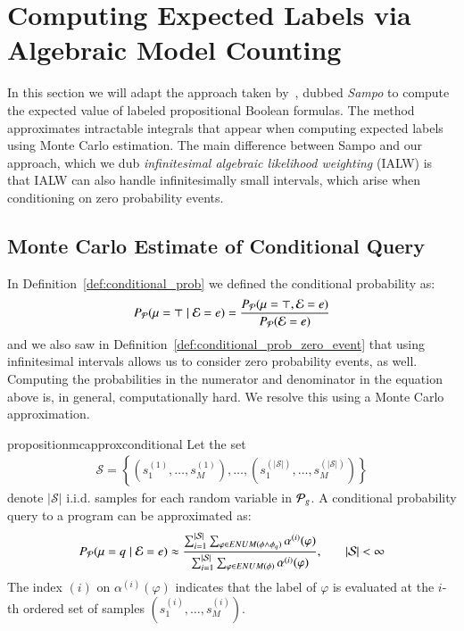 \section{Computing Expected Labels via Algebraic Model Counting}
\label{sec:alw}


In this section we will adapt the approach taken by~\citet{zuidbergdosmartires2019exact}, dubbed {\em Sampo} to compute the expected value of labeled propositional Boolean formulas.
The method approximates intractable integrals that appear when computing expected labels using Monte Carlo estimation. The main difference between Sampo and our approach, which we dub {\em infinitesimal algebraic likelihood weighting} (IALW) is that IALW can also handle infinitesimally small intervals, which arise when conditioning on zero probability events. 






\subsection{Monte Carlo Estimate of Conditional Query}

In Definition~\ref{def:conditional_prob} we defined the conditional probability as:
\begin{align}
    P_\mathcal{P}(\mu=\top\mid\mathcal{E}=e)= \frac{P_{\mathcal{P}}(\mu=\top, \mathcal{E}=e)}{P_\mathcal{P}(\mathcal{E}=e)} 
\end{align}
and we also saw in Definition~\ref{def:conditional_prob_zero_event} that using infinitesimal intervals allows us to consider zero probability events, as well. Computing the probabilities in the numerator and denominator in the equation above is, in general, computationally hard. We resolve this using a Monte Carlo approximation. 

\begin{restatable}{proposition}{mcapproxconditional}
\label{prop:mcapproxconditional}
Let the set 
\begin{align}
    \mathcal{S} = \left\{ \left(s_1^{(1)}, \dots, s_M^{(1)} \right), \dots , \left(s_1^{(\lvert \mathcal{S} \rvert)}, \dots, s_M^{(\lvert \mathcal{S} \rvert)} \right)  \right\} \label{eq:rejection_samples}
\end{align}
denote $\lvert \mathcal{S} \rvert$ i.i.d. samples for each random variable in $ \mathcal{P}_g$.
A conditional probability query to a  \dcproblogsty program \dcpprogram can be approximated as: 
\begin{align}
P_\mathcal{P}(\mu = q \mid \mathcal{E} = e) 
&\approx  \frac{ \sum_{i=1}^{\lvert \mathcal{S} \rvert}  \sum_{\varphi \in ENUM(\phi \land \phi_q) } \alpha^{(i)}(\varphi) } { \sum_{i=1}^{\lvert \mathcal{S} \rvert} \sum_{\varphi \in ENUM(\phi) } \alpha^{(i)}(\varphi) }, & \quad |\mathcal{S}|<\infty
\end{align}
The index $(i)$ on $\alpha^{(i)}(\varphi)$ indicates that the label of $\varphi$ is evaluated at the $i$-th ordered set of samples $ \left(s_1^{(i)}, \dots, s_M^{(i)} \right)$. 
\end{restatable}

